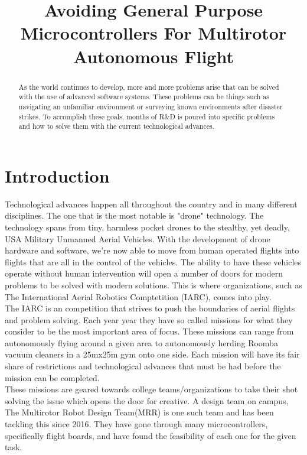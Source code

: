 \documentclass[conference,12pt, ]{IEEEtran}
\begin{document}
\title{Avoiding General Purpose Microcontrollers For Multirotor Autonomous Flight }

\author{
}


\maketitle

\begin{abstract}
As the world continues to develop, more and more problems arise that can be solved with the use of advanced software systems. These problems can be things such as navigating an unfamiliar environment or surveying known environments after disaster strikes. To accomplish these goals, months of R\&D is poured into specific problems and how to solve them with the current technological advances. 
\end{abstract}

\section{Introduction}
Technological advances happen all throughout the country and in many different disciplines. The one that is the most notable is "drone" technology. The technology spans from tiny, harmless pocket drones to the stealthy, yet deadly, USA Military Unmanned Aerial Vehicles. With the development of drone hardware and software, we're now able to move from human operated flights into flights that are all in the control of the vehicles. The ability to have these vehicles operate without human intervention will open a number of doors for modern problems to be solved with modern solutions. This is where organizations, such as The International Aerial Robotics Comptetition (IARC), comes into play.\\
The IARC is an competition that strives to push the boundaries of aerial flights and problem solving. Each year year they have so called missions for what they consider to be the most important area of focus. These missions can range from autonomously flying around a given area to autonomously herding Roomba vacuum cleaners in a 25mx25m gym onto one side. Each mission will have its fair share of restrictions and technological advances that must be had before the mission can be completed. \\
These missions are geared towards college teams/organizations to take their shot solving the issue which opens the door for creative. A design team on campus, The Multirotor Robot Design Team(MRR) is one such team and has been tackling this since 2016. They have gone through many microcontrollers, specifically flight boards, and have found the feasibility of each one for the given task.
\end{document}
